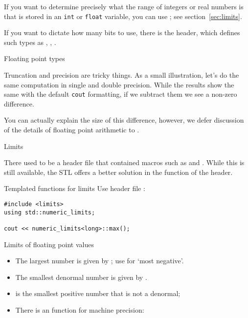 If you want to determine precisely what the range of
integers or real numbers is that is stored in an \lstinline{int} or \lstinline{float}
variable, you can use ; see section~\ref{sec:limits}.

If you want to dictate how many bits to use, there is
the  header, which defines such types
as , , .

 {Floating point types}

Truncation and precision are tricky things.
As a small illustration, let's do the same computation
in single and double precision.
While the results show the same with the default \lstinline{cout}
formatting,
if we subtract them we see a non-zero difference.


You can actually explain the size of this difference,
however, we defer discussion of the details
of floating point arithmetic to
.

 {Limits}
\label{sec:limits}

There used to be a header file  that contained
macros such as  and .
While this is still available,
the \ac{STL} offers a better solution in the
 function
of the  header.

\begin{block}{Templated functions for limits}
  \label{sl:stl-limits}
  Use header file :
\begin{lstlisting}
#include <limits>
using std::numeric_limits;

cout << numeric_limits<long>::max();
\end{lstlisting}
\end{block}

\begin{block}{Limits of floating point values}
  \label{sl:float-limits}
  \begin{itemize}
  \item The largest number is given by ;
    use  for `most negative'.
  \item The smallest denormal number is given by .
  \item {} is the smallest positive number
    that is not a denormal;
  \item There is an  function for machine precision:
  \end{itemize}
\end{block}

